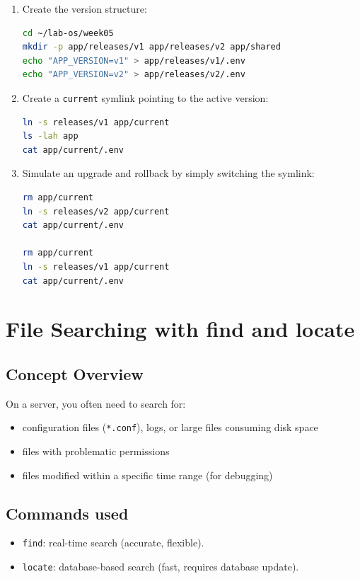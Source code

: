 \begin{enumerate}
    \item Create the version structure:
\begin{lstlisting}[language=bash, caption={Creating dummy application versions}]
cd ~/lab-os/week05
mkdir -p app/releases/v1 app/releases/v2 app/shared
echo "APP_VERSION=v1" > app/releases/v1/.env
echo "APP_VERSION=v2" > app/releases/v2/.env
\end{lstlisting}

    \item Create a \texttt{current} symlink pointing to the active version:
\begin{lstlisting}[language=bash, caption={Creating the current symlink}]
ln -s releases/v1 app/current
ls -lah app
cat app/current/.env
\end{lstlisting}

    \item Simulate an upgrade and rollback by simply switching the symlink:
\begin{lstlisting}[language=bash, caption={Switching versions via symlink}]
rm app/current
ln -s releases/v2 app/current
cat app/current/.env

rm app/current
ln -s releases/v1 app/current
cat app/current/.env
\end{lstlisting}
\end{enumerate}

\section{File Searching with find and locate}
\label{sec:search}

\subsection*{Concept Overview}
On a server, you often need to search for:
\begin{itemize}
    \item configuration files (\texttt{*.conf}), logs, or large files consuming disk space
    \item files with problematic permissions
    \item files modified within a specific time range (for debugging)
\end{itemize}

\subsection*{Commands used}
\begin{itemize}
    \item \texttt{find}: real-time search (accurate, flexible).
    \item \texttt{locate}: database-based search (fast, requires database update).
\end{itemize}

